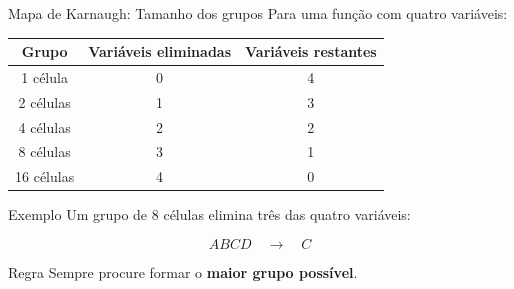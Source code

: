\begin{frame}{Mapa de Karnaugh: Tamanho dos grupos}
    \small
    Para uma função com quatro variáveis:
    \begin{center}
        \begin{tabular}{c|c|c}
            Grupo & Variáveis eliminadas & Variáveis restantes \\ \hline
            1 célula  & 0 & 4 \\
            2 células & 1 & 3 \\
            4 células & 2 & 2 \\
            8 células & 3 & 1 \\
            16 células & 4 & 0
        \end{tabular}
    \end{center}
    \begin{block}{Exemplo}
        Um grupo de $8$ células elimina três das quatro variáveis:

        \[
            ABCD
            \quad\longrightarrow\quad
            C
        \]
    \end{block}

    \begin{alertblock}{Regra}
        \centering
        Sempre procure formar o \textbf{maior grupo possível}.
    \end{alertblock}

\end{frame}